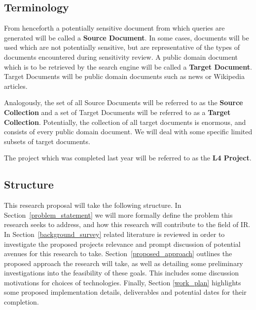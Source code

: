\documentclass{mprop}
\begin{document}
\subsection{Terminology}
From henceforth a potentially sensitive document from which queries are generated will be called a \textbf{Source Document}.
In some cases, documents will be used which are not potentially sensitive, but are representative of the types of documents encountered during  sensitivity review.
A public domain document which is to be retrieved by the search engine will be called a \textbf{Target Document}.
Target Documents will be public domain documents such as news or Wikipedia articles.

Analogously, the set of all Source Documents will be referred to as the \textbf{Source Collection} and a set of Target Documents will be referred to as a \textbf{Target Collection}.
Potentially, the collection of all target documents is enormous, and consists of every public domain document. We will deal with some specific limited subsets of target documents.

The project which was completed last year will be referred to as the \textbf{L4 Project}.

\subsection{Structure}
This research proposal will take the following structure. 
In Section~\ref{problem_statement} we will more formally define the problem this research seeks to address, and how this research will contribute to the field of IR. 
In Section~\ref{background_survey} related literature is reviewed in order to investigate the proposed projects relevance and prompt discussion of potential avenues for this research to take. 
Section~\ref{proposed_approach} outlines the proposed approach the research will take, as well as detailing some preliminary investigations into the feasibility of these goals. 
This includes some discussion motivations for choices of technologies.
Finally, Section \ref{work_plan} highlights some proposed implementation details, deliverables and potential dates for their completion.

\end{document}
